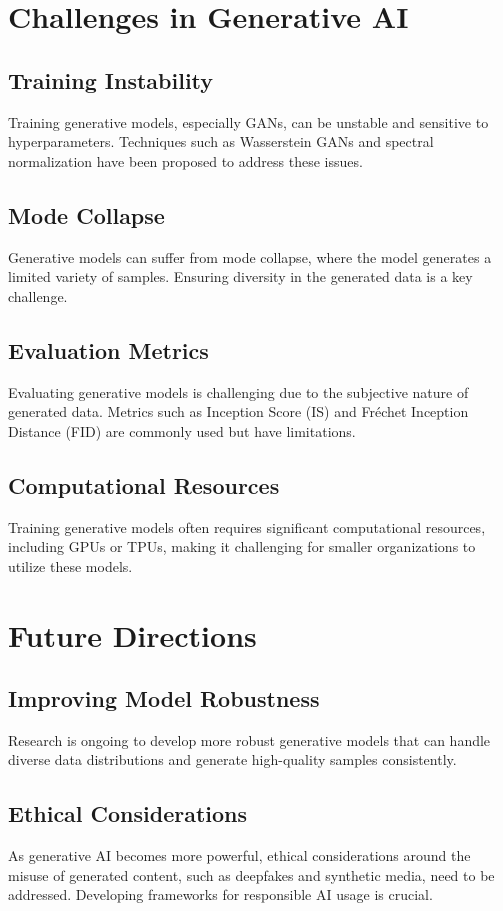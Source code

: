 \section{Challenges in Generative AI}

\subsection{Training Instability}
Training generative models, especially GANs, can be unstable and sensitive to hyperparameters. Techniques such as Wasserstein GANs and spectral normalization have been proposed to address these issues.

\subsection{Mode Collapse}
Generative models can suffer from mode collapse, where the model generates a limited variety of samples. Ensuring diversity in the generated data is a key challenge.

\subsection{Evaluation Metrics}
Evaluating generative models is challenging due to the subjective nature of generated data. Metrics such as Inception Score (IS) and Fréchet Inception Distance (FID) are commonly used but have limitations.

\subsection{Computational Resources}
Training generative models often requires significant computational resources, including GPUs or TPUs, making it challenging for smaller organizations to utilize these models.

\section{Future Directions}

\subsection{Improving Model Robustness}
Research is ongoing to develop more robust generative models that can handle diverse data distributions and generate high-quality samples consistently.

\subsection{Ethical Considerations}
As generative AI becomes more powerful, ethical considerations around the misuse of generated content, such as deepfakes and synthetic media, need to be addressed. Developing frameworks for responsible AI usage is crucial.

